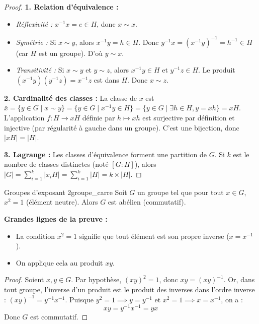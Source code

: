 \documentclass{prepacours}
\begin{document}
\begin{proof}
    \textbf{1. Relation d'équivalence :}
    \begin{itemize}
        \item \textit{Réflexivité :} $x^{-1}x = e \in H$, donc $x \sim x$.
        \item \textit{Symétrie :} Si $x \sim y$, alors $x^{-1}y = h \in H$. Donc $y^{-1}x = (x^{-1}y)^{-1} = h^{-1} \in H$ (car $H$ est un groupe). D'où $y \sim x$.
        \item \textit{Transitivité :} Si $x \sim y$ et $y \sim z$, alors $x^{-1}y \in H$ et $y^{-1}z \in H$. Le produit $(x^{-1}y)(y^{-1}z) = x^{-1}z$ est dans $H$. Donc $x \sim z$.
    \end{itemize}
    
    \textbf{2. Cardinalité des classes :}
    La classe de $x$ est $\bar{x} = \{y \in G \mid x \sim y\} = \{y \in G \mid x^{-1}y \in H\} = \{y \in G \mid \exists h \in H, y = xh\} = xH$.
    L'application $f : H \to xH$ définie par $h \mapsto xh$ est surjective par définition et injective (par régularité à gauche dans un groupe). C'est une bijection, donc $|xH| = |H|$.
    
    \textbf{3. Lagrange :}
    Les classes d'équivalence forment une partition de $G$. Si $k$ est le nombre de classes distinctes (noté $[G:H]$), alors $|G| = \sum_{i=1}^k |x_i H| = \sum_{i=1}^k |H| = k \times |H|$.
\end{proof}

\begin{proposition}{Groupes d'exposant 2}{groupe_carre}
    Soit $G$ un groupe tel que pour tout $x \in G$, $x^2 = 1$ (élément neutre).
    Alors $G$ est abélien (commutatif).
\end{proposition}

\noindent \textbf{Grandes lignes de la preuve :}
\begin{itemize}
    \item La condition $x^2=1$ signifie que tout élément est son propre inverse ($x = x^{-1}$).
    \item On applique cela au produit $xy$.
\end{itemize}

\begin{proof}
    Soient $x, y \in G$.
    Par hypothèse, $(xy)^2 = 1$, donc $xy = (xy)^{-1}$.
    Or, dans tout groupe, l'inverse d'un produit est le produit des inverses dans l'ordre inverse : $(xy)^{-1} = y^{-1}x^{-1}$.
    Puisque $y^2=1 \implies y=y^{-1}$ et $x^2=1 \implies x=x^{-1}$, on a :
    \[ xy = y^{-1}x^{-1} = yx \]
    Donc $G$ est commutatif.
\end{proof}
\end{document}
